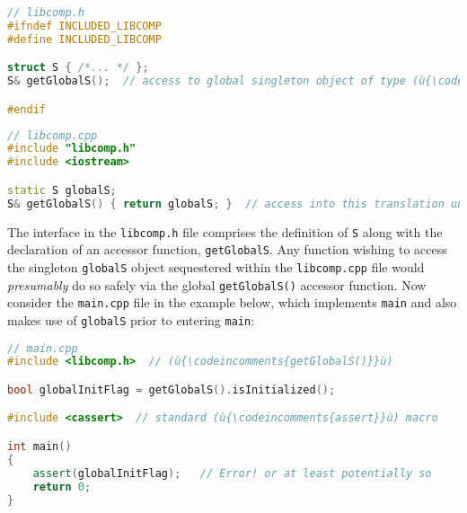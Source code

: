 \begin{lstlisting}[language=C++]
// libcomp.h
#ifndef INCLUDED_LIBCOMP
#define INCLUDED_LIBCOMP

struct S { /*... */ };
S& getGlobalS();  // access to global singleton object of type (ù{\codeincomments{S}}ù)

#endif
\end{lstlisting}


\begin{lstlisting}[language=C++]
// libcomp.cpp
#include "libcomp.h"
#include <iostream>

static S globalS;
S& getGlobalS() { return globalS; }  // access into this translation unit
\end{lstlisting}
    
\noindent The interface in the \lstinline!libcomp.h! file comprises the definition of
\lstinline!S! along with the declaration of an accessor function,
\lstinline!getGlobalS!. Any function wishing to access the singleton
\lstinline!globalS! object sequestered within the \lstinline!libcomp.cpp! file
would \emph{presumably} do so safely via the global
\lstinline!getGlobalS()! accessor function. Now consider the
\lstinline!main.cpp! file in the example below, which implements
\lstinline!main! and also makes use of \lstinline!globalS! prior to entering
\lstinline!main!:

\begin{lstlisting}[language=C++]
// main.cpp
#include <libcomp.h>  // (ù{\codeincomments{getGlobalS()}}ù)

bool globalInitFlag = getGlobalS().isInitialized();

#include <cassert>  // standard (ù{\codeincomments{assert}}ù) macro

int main()
{
    assert(globalInitFlag);   // Error! or at least potentially so
    return 0;
}
\end{lstlisting}
    
